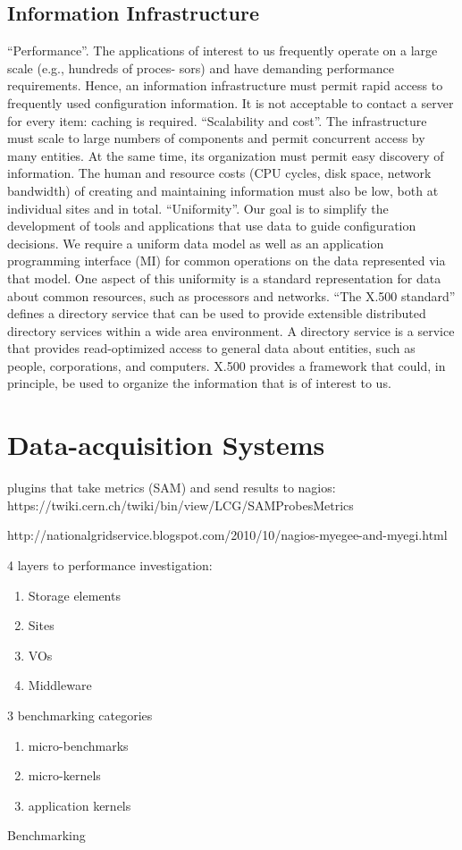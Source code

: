 \subsection{Information Infrastructure}
``Performance''.  The applications of interest to us frequently 
operate on  a  large scale  (e.g.,  hundreds  of  proces- 
sors) and have demanding performance requirements. 
Hence, an information infrastructure must permit rapid 
access to frequently used configuration information. It 
is not acceptable to contact  a  server  for every  item: 
caching is required.
``Scalability and cost''. The infrastructure must scale to large
numbers of components and permit concurrent access
by many entities. At the same time, its organization
must permit easy discovery of information. The human
and resource costs (CPU cycles, disk space, network
bandwidth) of creating and maintaining information
must also be low, both at individual sites and in total.
``Uniformity''. Our goal is to simplify the development of
tools and applications that use data to guide configuration
decisions. We require a uniform data model
as well as an application programming interface (MI)
for common operations on the data represented via that
model. One aspect of this uniformity is a standard representation
for data about common resources, such as
processors and networks.
``The X.500 standard'' defines a directory service
that can be used to provide extensible distributed directory
services within a wide area environment. A directory service
is a service that provides read-optimized access to general
data about entities, such as people, corporations, and computers.
X.500 provides a framework that could, in principle,
be used to organize the information that is of interest to us.
\cite{mds1}

\section{Data-acquisition Systems}
plugins that take metrics (SAM) and send results to nagios:
https://twiki.cern.ch/twiki/bin/view/LCG/SAMProbesMetrics

http://nationalgridservice.blogspot.com/2010/10/nagios-myegee-and-myegi.html

4 layers to performance investigation:
\begin{enumerate}
  \item Storage elements
  \item Sites
  \item VOs
  \item Middleware
\end{enumerate}
3 benchmarking categories
\begin{enumerate}
  \item micro-benchmarks
  \item micro-kernels
  \item application kernels
\end{enumerate}
Benchmarking

